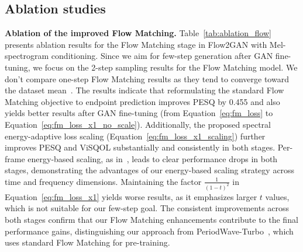 \vspace{-0.5em}
\subsection{Ablation studies}
\label{ssec:ablation}
\vspace{-0.5em}

\noindent\textbf{Ablation of the improved Flow Matching.} 
Table~\ref{tab:ablation_flow} presents ablation results for the Flow Matching stage in Flow2GAN with Mel-spectrogram conditioning. Since we aim for few-step generation after GAN fine-tuning, we focus on the 2-step sampling results for the Flow Matching model. We don't compare one-step Flow Matching results as they tend to converge toward the dataset mean~\citep{shortcut}. 
The results indicate that reformulating the standard Flow Matching objective to endpoint prediction improves PESQ by 0.455 and also yields better results after GAN fine-tuning (from Equation~\ref{eq:fm_loss} to Equation~\ref{eq:fm_loss_x1_no_scale}). Additionally, the proposed spectral energy-adaptive loss scaling (Equation~\ref{eq:fm_loss_x1_scaling}) further improves PESQ and ViSQOL substantially and consistently in both stages. 
Per-frame energy-based scaling, as in~\citep{priorgrad,rfwave}, leads to clear performance drops in both stages, demonstrating the advantages of our energy-based scaling strategy across time and frequency dimensions.
Maintaining the factor $\frac{1}{(1 - t)^2}$ in Equation~\ref{eq:fm_loss_x1} yields worse results, as it emphasizes larger $t$ values, which is not suitable for our few-step goal. The consistent improvements across both stages confirm that our Flow Matching enhancements contribute to the final performance gains, distinguishing our approach from PeriodWave-Turbo~\citep{periodwave_turbo}, which uses standard Flow Matching for pre-training.


